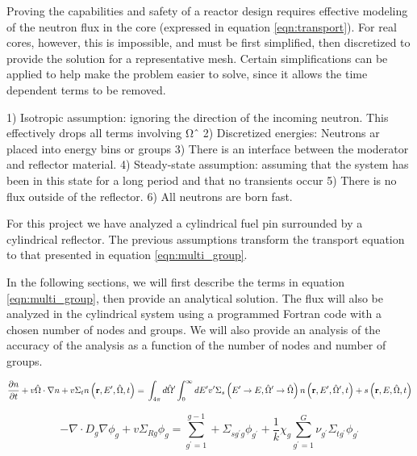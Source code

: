 \documentclass[../main.tex]{subfiles}
\begin{document}
Proving the capabilities and safety of a reactor design requires effective modeling of the neutron flux in the core (expressed in equation \ref{eqn:transport}). For real cores, however, this is impossible, and must be first simplified, then discretized to provide the solution for a representative mesh. Certain simplifications can be applied to help make the problem easier to solve, since it allows the time dependent terms to be removed.

1) Isotropic assumption: ignoring the direction of the incoming neutron. This effectively drops all terms involving Ωˆ
2) Discretized energies:  Neutrons ar placed into energy bins or groups
3) There is an interface between the moderator and reflector material.
4) Steady-state assumption: assuming that the system has been in this state for a long period and that no transients occur
5) There is no flux outside of the reflector.
6) All neutrons are born fast.



	For this project we have analyzed a cylindrical fuel pin surrounded by a cylindrical reflector.  The previous assumptions transform the transport equation to that presented in equation \ref{eqn:multi_group}.

	In the following sections, we will first describe the terms in equation \ref{eqn:multi_group}, then provide an analytical solution. The flux will also be analyzed in the cylindrical system using a programmed Fortran code with a chosen number of nodes and groups. We will also provide an analysis of the accuracy of the analysis as a function of the number of nodes and number of groups. 

	
	\begin{equation}
		\pdv{n}{t} + v \hat{\Omega} \cdot \nabla n + v \Sigma_t n \left( \mathbf{r}, E^\prime, \hat{\Omega}, t \right) = \\ \int_{4\pi} d \hat{\Omega} ^\prime \int_0^{\infty} dE ^\prime v^\prime \Sigma_s\left( E ^\prime \rightarrow E, \hat{\Omega} ^\prime \rightarrow \hat{\Omega} \right) n\left( \mathbf{r}, E ^\prime, \hat{\Omega} ^\prime, t \right) + s\left( \mathbf{r}, E, \hat{\Omega}, t \right)
		\label{eqn:transport}
	\end{equation}
	
	\begin{equation}
		- \nabla \cdot D_{g} \nabla \phi_{g}+ v \Sigma_{Rg} \phi_g = \sum_{g^{'}=1}^{g-1} + \Sigma_{sg^{'}g} \phi_{g^{'}} + \frac{1}{k} \chi_g \sum_{g^{'}=1}^{G} \nu_{g^{'}} \Sigma_{tg^{'}} \phi_{g^{'}} 
		\label{eqn:multi_group}
	\end{equation}
  
\end{document}
